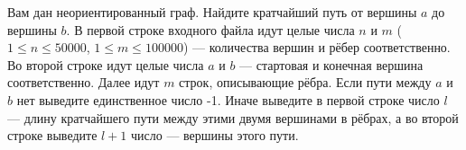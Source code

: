 Вам дан неориентированный граф. Найдите кратчайший путь от вершины $a$ до вершины $b$.
\InputFile
В первой строке входного файла идут целые числа $n$ и $m$ ($1 \leq n \leq 50000$, $1 \leq m \leq 100000$) --- количества вершин и рёбер соответственно. Во второй строке идут целые числа $a$ и $b$ --- стартовая и конечная вершина соответственно. Далее идут $m$ строк, описывающие рёбра.
\OutputFile
Если пути между $a$ и $b$ нет выведите единственное число -1. Иначе выведите в первой строке число $l$ --- длину кратчайшего пути между этими двумя вершинами в рёбрах, а во второй строке выведите $l + 1$ число --- вершины этого пути.

